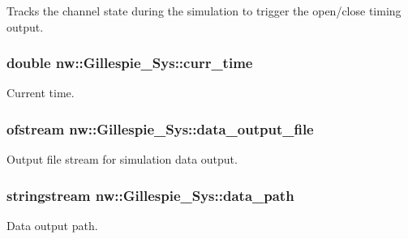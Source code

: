 Tracks the channel state during the simulation to trigger the open/close timing output. 

\hypertarget{classnw_1_1_gillespie___sys_ac83bb4eaee1f8b46610a8243a83fb3ad}{
\subsubsection[{curr\+\_\+time}]{\setlength{\rightskip}{0pt plus 5cm}double nw\+::\+Gillespie\+\_\+\+Sys\+::curr\+\_\+time\hspace{0.3cm}{\ttfamily [private]}}}\label{classnw_1_1_gillespie___sys_ac83bb4eaee1f8b46610a8243a83fb3ad}


Current time. 

\hypertarget{classnw_1_1_gillespie___sys_aec438472b938a410f0d31af0ae73a164}{
\subsubsection[{data\+\_\+output\+\_\+file}]{\setlength{\rightskip}{0pt plus 5cm}ofstream nw\+::\+Gillespie\+\_\+\+Sys\+::data\+\_\+output\+\_\+file\hspace{0.3cm}{\ttfamily [private]}}}\label{classnw_1_1_gillespie___sys_aec438472b938a410f0d31af0ae73a164}


Output file stream for simulation data output. 

\hypertarget{classnw_1_1_gillespie___sys_a989a4288ca9dd4eaf9a5ef45c805260e}{
\subsubsection[{data\+\_\+path}]{\setlength{\rightskip}{0pt plus 5cm}stringstream nw\+::\+Gillespie\+\_\+\+Sys\+::data\+\_\+path\hspace{0.3cm}{\ttfamily [private]}}}\label{classnw_1_1_gillespie___sys_a989a4288ca9dd4eaf9a5ef45c805260e}


Data output path. 

